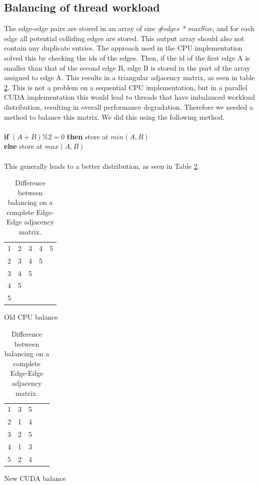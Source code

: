 \subsection{Balancing of thread workload}
\label{subsec:balance}
The edge-edge pairs are stored in an array of size \textit{\#edges * maxSize}, and for each edge all potential colliding edges are stored. This output array should also not contain any duplicate entries. The approach used in the CPU implementation solved this by checking the ids of the edges. Then, if the id of the first edge A is smaller than that of the second edge B, edge B is stored in the part of the array assigned to edge A. This results in a triangular adjacency matrix, as seen in table \ref{table:balance}. This is not a problem on a sequential CPU implementation, but in a parallel CUDA implementation this would lead to threads that have imbalanced workload distribution, resulting in overall performance degradation. Therefore we needed a method to balance this matrix. We did this using the following method.\\
\\
\indent \indent \textbf{if} $(A + B) \% 2 = 0$ \textbf{then} store at $min(A,B)$\\
\indent \indent \textbf{else} store at $max(A,B)$ \\
\\
This generally leads to a better distribution, as seen in Table \ref{table:balance}.

\begin{table}[!htb]
    	\begin{subtable}{.5\linewidth}
		\centering
		\begin{tabular}{ c || c | c | c | c }
			1 & 2 & 3 & 4 & 5 \\
			2 & 3 & 4 & 5 \\
			3 & 4 & 5 & \\
			4 & 5 & & \\
			5 & & &\\
		\end{tabular}
		\caption{Old CPU balance}
	\end{subtable}%
    	\begin{subtable}{.5\linewidth}
		\centering        
		\begin{tabular}{ c || c | c | c | c }
			1 & 3 & 5 &  &  \\
			2 & 1 & 4 &  &\\
			3 & 2 & 5 &  &\\
			4 & 1 & 3 &  &\\
			5 & 2 & 4 &  &\\
		\end{tabular}
		\caption{New CUDA balance}
	\end{subtable} 
	\caption{Difference between balancing on a complete Edge-Edge adjacency matrix.}
	\label{table:balance}
\end{table}


